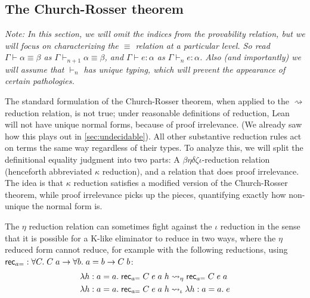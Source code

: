 \subsection{The Church-Rosser theorem}\label{sec:church_rosser}
\emph{Note: In this section, we will omit the indices from the provability relation, but we will focus on characterizing the $\equiv$ relation at a particular level. So read $\Gamma\vdash \alpha\equiv\beta$ as $\Gamma\vdash_{n+1} \alpha\equiv\beta$, and $\Gamma\vdash e:\alpha$ as $\Gamma\vdash_n e:\alpha$. Also (and importantly) we will assume that $\vdash_n$ has unique typing, which will prevent the appearance of certain pathologies.}

The standard formulation of the Church-Rosser theorem, when applied to the $\rightsquigarrow$ reduction relation, is not true; under reasonable definitions of reduction, Lean will not have unique normal forms, because of proof irrelevance. (We already saw how this plays out in \autoref{sec:undecidable}). All other substantive reduction rules act on terms the same way regardless of their types. To analyze this, we will split the definitional equality judgment into two parts: A $\beta\eta\delta\zeta\iota$-reduction relation (henceforth abbreviated $\kappa$ reduction), and a relation that does proof irrelevance. The idea is that $\kappa$ reduction satisfies a modified version of the Church-Rosser theorem, while proof irrelevance picks up the pieces, quantifying exactly how non-unique the normal form is.

The $\eta$ reduction relation can sometimes fight against the $\iota$ reduction in the sense that it is possible for a K-like eliminator to reduce in two ways, where the $\eta$ reduced form cannot reduce, for example with the following reductions, using $\mathsf{rec}_{a=}:\forall C.\;C\;a\to \forall b.\;a=b\to C\;b$:
\begin{align*}
&\lambda h:a=a.\;\mathsf{rec}_{a=}\;C\;e\;a\;h\rightsquigarrow_\eta\mathsf{rec}_{a=}\;C\;e\;a\\
&\lambda h:a=a.\;\mathsf{rec}_{a=}\;C\;e\;a\;h\rightsquigarrow_\iota\lambda h:a=a.\;e
\end{align*}

